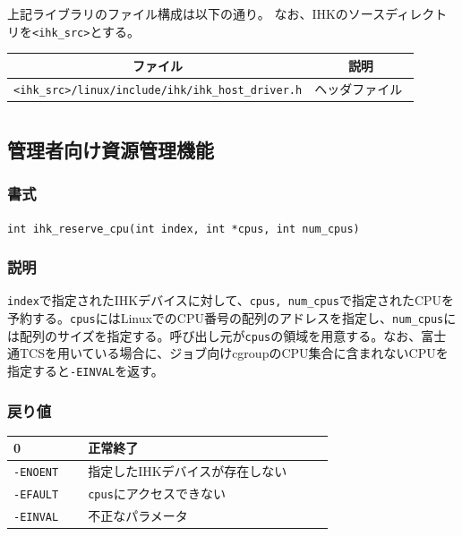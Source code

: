 \documentclass[twoside,11pt,fleqn]{book}
\begin{document}
上記ライブラリのファイル構成は以下の通り。
なお、IHKのソースディレクトリを\texttt{<ihk\_src>}とする。
\begin{table}[!h]
\footnotesize
\begin{tabular}{|p{0.50\linewidth}|p{0.40\linewidth}|} \hline
\multicolumn{1}{|c}{\textbf{ファイル}}&\multicolumn{1}{|c|}{\textbf{説明}}\\ \hline \hline
\texttt{<ihk\_src>/linux/include/ihk/ihk\_host\_driver.h}&ヘッダファイル\\ \hline
\end{tabular}
\vspace{-0em}
\end{table}
\FloatBarrier


\section{}

\subsection{管理者向け資源管理機能}

\subsubsection{}
\subsubsection*{書式}{\quad} \texttt{int ihk\_reserve\_cpu(int index, int *cpus, int num\_cpus)}
\subsubsection*{説明}{\quad} \texttt{index}で指定されたIHKデバイスに対して、\texttt{cpus, num\_cpus}で指定されたCPUを予約する。\texttt{cpus}にはLinuxでのCPU番号の配列のアドレスを指定し、\texttt{num\_cpus}には配列のサイズを指定する。呼び出し元が\texttt{cpus}の領域を用意する。なお、富士通TCSを用いている場合に、ジョブ向けcgroupのCPU集合に含まれないCPUを指定すると\verb:-EINVAL:を返す。

\subsubsection*{戻り値}{\quad}
\begin{table}[!h]
\footnotesize
\begin{tabular}{|p{0.20\linewidth}|p{0.66\linewidth}|} \hline
0&正常終了\\ \hline
\texttt{-ENOENT}&指定したIHKデバイスが存在しない\\ \hline
\texttt{-EFAULT}&\texttt{cpus}にアクセスできない\\ \hline
\texttt{-EINVAL}&不正なパラメータ\\ \hline
\end{tabular}
\vspace{-0em}
\end{table}
\FloatBarrier
\end{document}
